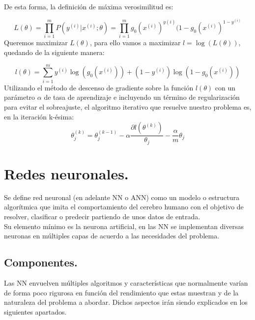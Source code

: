 \documentclass[a4paper,10pt]{article}
\begin{document}
De esta forma, la definición de máxima verosimilitud es:

\[
L(\theta)=\prod_{i=1}^{m}P(y^{(i)}|x^{(i)};\theta)=\prod_{i=1}^{m}g_0(x^{(i)})^{y(i)}(1-g_0(x^{(i)})^{1-y^{(i)}}
\]
Queremos maximizar $L(\theta)$,  para
ello vamos a maximizar $l = \log{(L(\theta))}$, quedando de la siguiente manera:

\[
l(\theta)=\sum_{i=1}^my^{(i)}\log{(g_0(x^{(i)}))}+(1-y^{(i)})\log{(1-g_0(x^{(i)}))}
\]
Utilizando el método de descenso de gradiente sobre la función $l(\theta)$ con un
parámetro $\alpha$ de tasa de aprendizaje e incluyendo un término de regularización
para evitar el sobreajuste, el algoritmo iterativo que resuelve nuestro problema
es, en la iteración k-ésima:
\[
\theta_j^{(k)}=\theta_j^{(k-1)}-\alpha\frac{\partial l(\theta^{(k)})}{\theta_j}-\frac{\alpha}{m}\theta_j
\]

\newpage
\section{Redes neuronales.}

Se define red neuronal (en adelante NN o ANN) como un modelo o estructura algorítmica que imita el comportamiento del cerebro humano con el objetivo de resolver, clasificar o predecir partiendo de unos datos de entrada.\\
Su elemento mínimo es la neurona artificial, en las NN se implementan diversas neuronas en múltiples capas de acuerdo a las necesidades del problema.

\subsection{Componentes.}
Las NN envuelven múltiples algoritmos y características que normalmente varían de forma poco rigurosa en función del rendimiento que estas muestran y de la naturaleza del problema a abordar. Dichos aspectos irán siendo explicados en los siguientes apartados.
\end{document}
